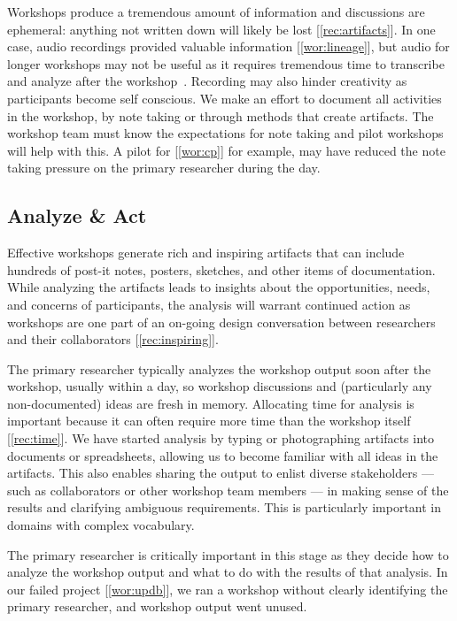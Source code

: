 Workshops produce a tremendous amount of information and discussions are ephemeral: anything not written down will likely be lost [\ref{rec:artifacts}]. In one case, audio recordings provided valuable information [\ref{wor:lineage}], but audio for longer workshops may not be useful as it requires tremendous time to transcribe and analyze after the workshop~\cite{Lloyd2011}. Recording may also hinder creativity as participants become self conscious. We make an effort to document all activities in the workshop, by note taking or through methods that create artifacts. The workshop team must know the expectations for note taking and pilot workshops will help with this. A pilot for [\ref{wor:cp}] for example, may have reduced the note taking pressure on the primary researcher during the day.

\subsection{Analyze \& Act}

Effective workshops generate rich and inspiring artifacts that can include hundreds of post-it notes, posters, sketches, and other items of documentation. While analyzing the artifacts leads to insights about the opportunities, needs, and concerns of participants, the analysis will warrant continued action as workshops are one part of an on-going design conversation between researchers and their collaborators [\ref{rec:inspiring}].

The primary researcher typically analyzes the workshop output soon after the workshop, usually within a day, so workshop discussions and (particularly any non-documented) ideas are fresh in memory. Allocating time for analysis is important because it can often require more time than the workshop itself [\ref{rec:time}]. We have started analysis by typing or photographing artifacts into documents or spreadsheets, allowing  us to become familiar with all ideas in the artifacts. This also enables sharing the output to enlist diverse stakeholders --- such as collaborators or other workshop team members --- in making sense of the results and clarifying ambiguous requirements. This is particularly important in domains with complex vocabulary.

The primary researcher is critically important in this stage as they decide how to analyze the workshop output and what to do with the results of that analysis. In our failed project [\ref{wor:updb}], we ran a workshop without clearly identifying the primary researcher, and workshop output went unused.

